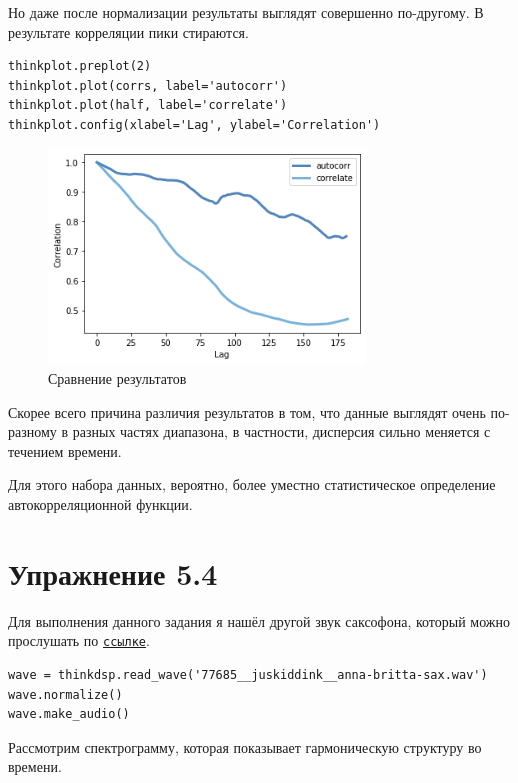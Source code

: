\documentclass[a4paper,12pt]{report}
\begin{document}
Но даже после нормализации результаты выглядят совершенно по-другому. В результате корреляции пики стираются.

\begin{lstlisting}[caption=Сравнение результатов]
thinkplot.preplot(2)
thinkplot.plot(corrs, label='autocorr')
thinkplot.plot(half, label='correlate')
thinkplot.config(xlabel='Lag', ylabel='Correlation')
\end{lstlisting}

\begin{figure}[H]
        \centering
        \includegraphics[width=0.75\textwidth]{lab5_fig3_7.png}
        \caption{Сравнение результатов}
        \label{fig:lab5_fig3_7}
\end{figure}

Скорее всего причина различия результатов в том, что данные выглядят очень по-разному в разных частях диапазона, в частности, дисперсия сильно меняется с течением времени.

Для этого набора данных, вероятно, более уместно статистическое определение автокорреляционной функции.

\chapter{Упражнение 5.4}

Для выполнения данного задания я нашёл другой звук саксофона, который можно прослушать по  \href{https://freesound.org/people/felix.blume/sounds/414062/}{\texttt{ссылке}}.

\begin{lstlisting}[caption=Загрузка звука]
wave = thinkdsp.read_wave('77685__juskiddink__anna-britta-sax.wav')
wave.normalize()
wave.make_audio()
\end{lstlisting}

Рассмотрим спектрограмму, которая показывает гармоническую структуру во времени.
\end{document}
